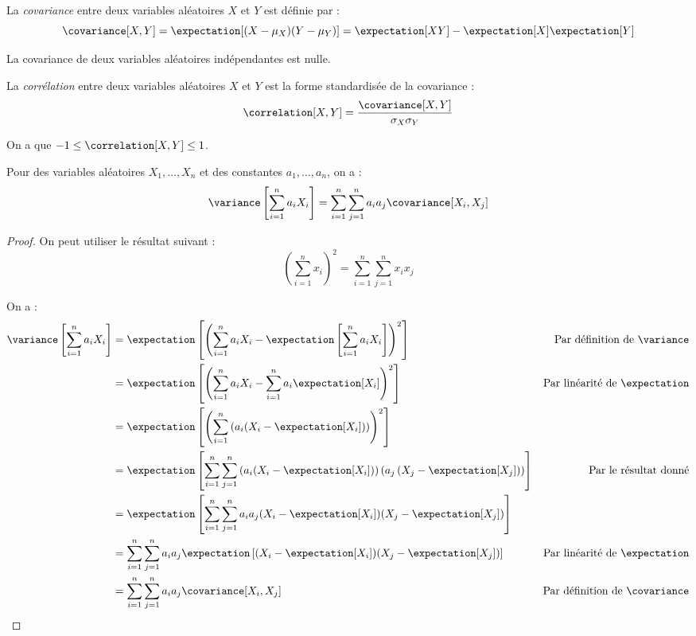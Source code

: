     \begin{definition}
        La \textit{covariance} entre deux variables aléatoires \(X\) et \(Y\) est définie par :
        \[
            \covariance[X, Y] = \expectation[(X - \mu_X)(Y - \mu_Y)] = \expectation[XY] - \expectation[X]\expectation[Y]
        \]

        La covariance de deux variables aléatoires indépendantes est nulle.

        La \textit{corrélation} entre deux variables aléatoires \(X\) et \(Y\) est la forme standardisée de la covariance :
        \[
            \correlation[X, Y] = \frac{\covariance[X, Y]}{\sigma_X \sigma_Y}
        \]

        On a que \(-1 \leq \correlation[X, Y] \leq 1\).
    \end{definition}

    \begin{theorem}
        Pour des variables aléatoires \(X_1, \dots, X_n\) et des constantes \(a_1, \dots, a_n\), on a :
        \[
            \variance\left[\sum_{i=1}^n a_i X_i\right] = \sum_{i=1}^n \sum_{j=1}^n a_i a_j \covariance[X_i, X_j]
        \]
    \end{theorem}
    \begin{proof}
        On peut utiliser le résultat suivant :
        \[
            \left(\sum_{i=1}^n x_i\right)^2 = \sum_{i=1}^n \sum_{j=1}^n x_i x_j
        \]

        On a :
        \begin{align*}
            \variance\left[\sum_{i=1}^n a_i X_i\right] &= \expectation\left[\left(\sum_{i=1}^n a_i X_i - \expectation\left[\sum_{i=1}^n a_i X_i\right]\right)^2\right] & \text{Par définition de \(\variance\)}\\
            &= \expectation\left[\left(\sum_{i=1}^n a_i X_i - \sum_{i=1}^n a_i \expectation[X_i]\right)^2\right] & \text{Par linéarité de \(\expectation\)}\\
            &= \expectation\left[\left(\sum_{i=1}^n \left(a_i (X_i - \expectation[X_i])\right)\right)^2\right]\\
            &= \expectation\left[\sum_{i=1}^n \sum_{j=1}^n \left(a_i (X_i - \expectation[X_i])\right)\left(a_j \left(X_j - \expectation[X_j]\right)\right)\right] & \text{Par le résultat donné}\\
            &= \expectation\left[\sum_{i=1}^n \sum_{j=1}^n a_ia_j (X_i - \expectation[X_i])(X_j - \expectation[X_j])\right]\\
            &= \sum_{i=1}^n \sum_{j=1}^n a_i a_j \expectation\left[(X_i - \expectation[X_i])(X_j - \expectation[X_j])\right] & \text{Par linéarité de \(\expectation\)}\\
            &= \sum_{i=1}^n \sum_{j=1}^n a_i a_j \covariance[X_i, X_j] & \text{Par définition de \(\covariance\)}
        \end{align*}
    \end{proof}

